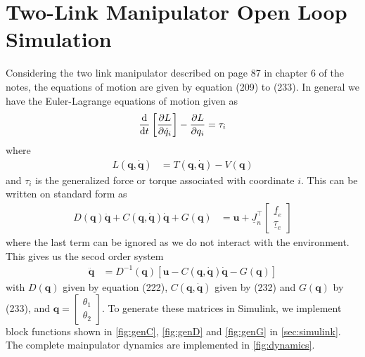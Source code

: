 \documentclass[a4paper]{scrartcl}
\begin{document}
\section{Two-Link Manipulator Open Loop Simulation}
Considering the two link manipulator described on page 87 in chapter 6 of the notes, the equations of motion are given by equation (209) to (233). In general we have the Euler-Lagrange equations of motion given as
\begin{equation}
	\begin{aligned}
		\dv{t}\left[\pdv{L}{\dot{q}_i} (q,\dot{q}) \right] - \pdv{L}{q_i} (q,\dot{q}) &= \tau_i \\
	\end{aligned}
\end{equation}
where
\begin{equation}
	\begin{aligned}
		L(\bm{q},\dot{\bm{q}}) &= T(\bm{q},\dot{\bm{q}}) - V(\bm{q})
	\end{aligned}
\end{equation}
and $\tau_i$ is the generalized force or torque associated with coordinate $i$. This can be written on standard form as
\begin{equation}
	\begin{aligned}
		D(\bm{q})\ddot{\bm{q}} + C(\bm{q},\dot{\bm{q}})\dot{\bm{q}} + G(\bm{q}) &= \bm{u} + \underline{J}^\top_n \begin{bmatrix} \underline{f}_e \\ \underline{\tau}_e \end{bmatrix}
	\end{aligned}
\end{equation} 
where the last term can be ignored as we do not interact with the environment. This gives us the secod order system
\begin{equation}
	\begin{aligned}
		\ddot{\bm{q}} &= D^{-1}(\bm{q})\left[\bm{u} - C(\bm{q},\dot{\bm{q}})\dot{\bm{q}} - G(\bm{q}) \right]
	\end{aligned}
\end{equation}
with $D(\bm{q})$ given by equation (222), $C(\bm{q},\dot{\bm{q}})$ given by (232) and $G(\bm{q})$ by (233), and $\bm{q} = \begin{bmatrix}
	\theta_1 \\ \theta_2
\end{bmatrix}$. To generate these matrices in Simulink, we implement block functions shown in \autoref{fig:genC}, \autoref{fig:genD} and \autoref{fig:genG} in \autoref{sec:simulink}. The complete mainpulator dynamics are implemented in \autoref{fig:dynamics}.
\end{document}
